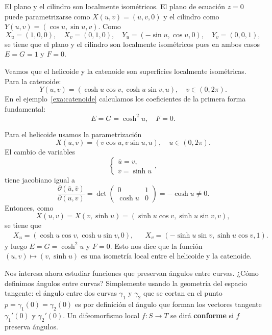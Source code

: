 \begin{example}
	El plano y el cilindro son localmente isométricos. El plano de ecuación
	$z=0$ puede parametrizarse como $X(u,v)=(u,v,0)$ y el cilindro como
	$Y(u,v)=(\cos u,\sin u,v)$. Como
	\[
		X_u=(1,0,0),\quad
		X_v=(0,1,0),\quad
		Y_u=(-\sin u,\cos u,0),\quad
		Y_v=(0,0,1),
	\]
	se tiene que el plano y el cilindro son localmente isométricos pues en
	ambos casos $E=G=1$ y $F=0$.
\end{example}

\begin{example}
	Veamos que el helicoide y la catenoide son superficies localmente
	isométricas. 
	Para la catenoide:
	\[
		Y(u,v)=(\cosh u\cos v,\cosh u\sin v,u),\quad v\in(0,2\pi).
	\]
	En el ejemplo~\ref{exa:catenoide} calculamos los coeficientes de la primera
	forma fundamental:
	\[
		E=G=\cosh^2 u,\quad
		F=0.
	\]

	Para el helicoide usamos la parametrización
	\[
		X(\overline{u},\overline{v})=(\overline{v}\cos\overline{u},\overline{v}\sin\overline{u},\overline{u}),\quad \overline{u}\in(0,2\pi).
	\]
	El cambio de variables 
	\[
	\begin{cases}
		\overline{u}=v,\\
		\overline{v}=\sinh u
	\end{cases},
	\]
	tiene jacobiano igual a 
	\[
		\frac{\partial(\overline{u},\overline{v})}{\partial(u,v)}
		=\det\begin{pmatrix}
			0 & 1\\
			\cosh u & 0
		\end{pmatrix}=-\cosh u\ne 0.
	\]
	Entonces, como
	\[
		X(u,v)=X(v,\sinh u)=(\sinh u\cos v,\sinh u\sin v,v),
	\]
	se tiene que 
	\begin{align*}
		&X_u=(\cosh u\cos v,\cosh u\sin v,0), &&
		X_v=(-\sinh u\sin v,\sinh u\cos v,1).
	\end{align*}
	y luego
	$E=G=\cosh^2 u$ y $F=0$. Esto nos dice que la función $(u,v)\mapsto
	(v,\sinh u)$ es una isometría local entre el helicoide y la catenoide. 
\end{example}

Nos interesa ahora estudiar funciones que preservan ángulos entre curvas. ¿Cómo
definimos ángulos entre curvas? Simplemente usando la geometría del espacio
tangente: el ángulo entre dos curvas $\gamma_1$ y $\gamma_2$ que se
cortan en el punto $p=\gamma_1(0)=\gamma_2(0)$ es por definición el ángulo que
forman los vectores tangente $\gamma_1'(0)$ y $\gamma_2'(0)$.  Un difeomorfismo
local $f\colon S\to T$ se dirá \textbf{conforme} si 
$f$ preserva ángulos. 

